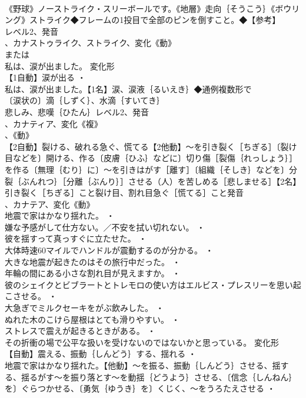 \documentclass[8pt]{extreport}
\begin{document}
\begin{CJK}{UTF8}{min}
\\	《野球》ノーストライク・スリーボールです。《地層》走向｛そうこう｝《ボウリング》ストライク◆フレームの1投目で全部のピンを倒すこと。◆【参考】
\\	レベル2、発音
\\	、カナストゥライク、ストライク、変化《動》
\\	または
\\	私は、涙が出ました。	変化形 
\\	【1自動】涙が出る ・
\\	私は、涙が出ました。【1名】涙、涙液｛るいえき｝◆通例複数形で
\\	〔涙状の〕滴｛しずく｝、水滴｛すいてき｝
\\	悲しみ、悲嘆｛ひたん｝レベル2、発音
\\	、カナティア、変化《複》
\\	、《動》
\\	【2自動】裂ける、破れる急ぐ、慌てる【2他動】～を引き裂く［ちぎる］〔裂け目などを〕開ける、作る〔皮膚｛ひふ｝などに〕切り傷［裂傷｛れっしょう｝］を作る〔無理｛むり｝に〕～を引きはがす［離す］〔組織｛そしき｝などを〕分裂｛ぶんれつ｝［分離｛ぶんり｝］させる（人）を苦しめる［悲しませる］【2名】引き裂く［ちぎる］こと裂け目、割れ目急ぐ［慌てる］こと発音
\\	、カナテア、変化《動》
\\	地震で家はかなり揺れた。 ・
\\	嫌な予感がして仕方ない。／不安を拭い切れない。 ・
\\	彼を揺すって真っすぐに立たせた。 ・
\\	大体時速60マイルでハンドルが震動するのが分かる。 ・
\\	大きな地震が起きたのはその旅行中だった。 ・
\\	年輪の間にある小さな割れ目が見えますか。 ・
\\	彼のシェイクとビブラートとトレモロの使い方はエルビス・プレスリーを思い起こさせる。 ・
\\	大急ぎでミルクセーキをがぶ飲みした。 ・
\\	ぬれた木のこけら屋根はとても滑りやすい。 ・
\\	ストレスで震えが起きるときがある。 ・
\\	その折衝の場で公平な扱いを受けないのではないかと思っている。	変化形 
\\	【自動】震える、振動｛しんどう｝する、揺れる ・
\\	地震で家はかなり揺れた。【他動】～を振る、振動｛しんどう｝させる、揺する、揺るがす～を振り落とす～を動揺｛どうよう｝させる、〔信念｛しんねん｝を〕ぐらつかせる、〔勇気｛ゆうき｝を〕くじく、～をうろたえさせる ・

\end{CJK}
\end{document}
